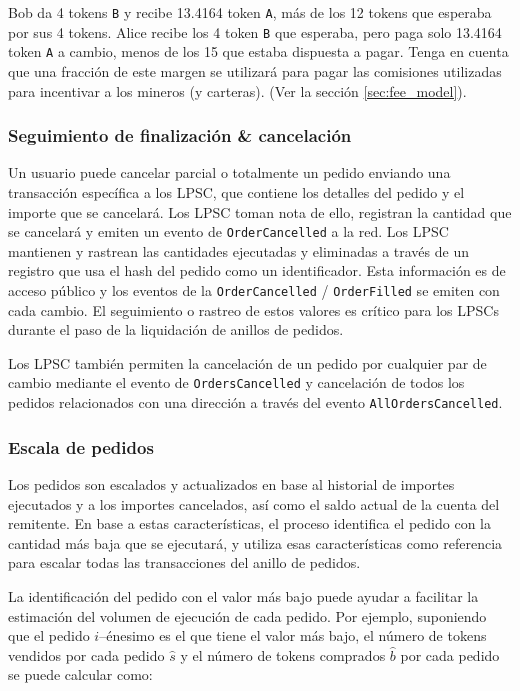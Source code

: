 \documentclass[UTF8,nofonts]{article}
\begin{document}
\begin{multicols}{2}
Bob da 4 tokens \verb|B| y recibe 13.4164 token \verb|A|, m\'as de los 12 tokens que esperaba por sus 4 tokens. Alice recibe los 4 token \verb|B| que esperaba, pero paga solo 13.4164 token \verb|A| a cambio, menos de los 15 que estaba dispuesta a pagar. Tenga en cuenta que una fracci\'on de este margen se utilizar\'a para pagar las comisiones utilizadas para incentivar a los mineros (y carteras). (Ver la secci\'on \ref{sec:fee_model}).


\subsubsection{Seguimiento de finalizaci\'on \& cancelaci\'on}
Un usuario puede cancelar parcial o totalmente un pedido enviando una transacci\'on espec\'ifica a los LPSC, que contiene los detalles del pedido y el importe que se cancelar\'a. Los LPSC toman nota de ello, registran la cantidad que se cancelar\'a y emiten un evento de \verb|OrderCancelled| a la red. Los LPSC mantienen y rastrean las cantidades ejecutadas y eliminadas a trav\'es de un registro que usa el hash del pedido como un identificador. Esta informaci\'on es de acceso p\'ublico y los eventos de la \verb|OrderCancelled| / \verb|OrderFilled| se emiten con cada cambio. El seguimiento o rastreo de estos valores es cr\'itico para los LPSCs durante el paso de la liquidaci\'on de anillos de pedidos. 

Los LPSC tambi\'en permiten la cancelaci\'on de un pedido por cualquier par de cambio mediante el evento de \verb|OrdersCancelled| y cancelaci\'on de todos los pedidos relacionados con una direcci\'on a trav\'es del evento \verb|AllOrdersCancelled|.


\subsubsection{Escala de pedidos\label{sec:order_scaling}}
Los pedidos son escalados y actualizados en base al historial de importes ejecutados y a los importes cancelados, as\'i como el saldo actual de la cuenta del remitente. En base a estas caracter\'isticas, el proceso identifica el pedido con la cantidad m\'as baja que se ejecutar\'a, y utiliza esas caracter\'isticas como referencia para escalar todas las transacciones del anillo de pedidos.

La identificaci\'on del pedido con el valor m\'as bajo puede ayudar a facilitar la estimaci\'on del volumen de ejecuci\'on de cada pedido. Por ejemplo, suponiendo que el pedido $i$--\'enesimo es el que tiene el valor m\'as bajo, el n\'umero de tokens vendidos por cada pedido $\hat{s}$ y el n\'umero de tokens comprados $\hat{b}$  por cada pedido se puede calcular como: 


\end{multicols}
\end{document}
